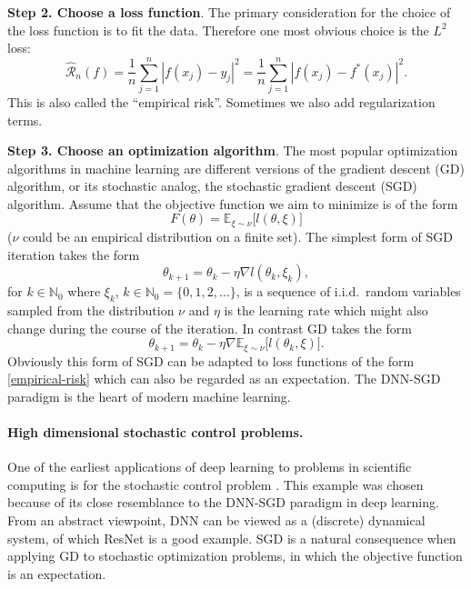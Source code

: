 \documentclass[12pt]{article}
\theoremstyle{definition}
\newcommand{\E}{\mathbb{E}}
\newcommand{\N}{\mathbb{N}}
\newcommand{\bx}{{x}}
\begin{document}
{\bf Step 2. Choose a loss function}. The primary consideration for the
choice of the loss function is to fit the data.  Therefore one most obvious
choice is the $L^2$ loss:
\begin{equation}
\hat{\mathcal{R}}_n(f) = \frac1n \sum_{j=1}^n | f(\bx_j) - y_j |^2 = \frac 1n \sum_{j=1}^n | f(\bx_j) - f^*(\bx_j) |^2.
\label{empirical-risk}
\end{equation}
This is also called the ``empirical risk''.
Sometimes we also add regularization terms.

{\bf Step 3. Choose an optimization algorithm}.  
The most popular optimization algorithms in machine learning are different versions of
the gradient descent (GD) algorithm, or its stochastic analog, the
stochastic gradient descent (SGD) algorithm. Assume that the objective function we aim to minimize is of the form
\begin{equation}
F(\theta) = \E_{\xi \sim \nu}\big[ l(\theta, \xi) \big]
\label{expectation}
\end{equation}
($\nu$ could be an empirical distribution on a finite set). 
The simplest form of SGD iteration takes the form 
%
\begin{equation}
\theta_{k+1} = \theta_k - \eta \nabla l(\theta_k, \xi_k),
\end{equation}
for $ k \in \N_0 $ where $ \xi_k $, $ k \in \N_0 = \{ 0, 1, 2, \dots \} $, is a sequence of 
i.i.d.\ random variables sampled from the distribution $ \nu $ 
and $ \eta $ is the learning rate which might also change during the course of the iteration.
In contrast GD takes the form
\begin{equation}
\theta_{k+1} = \theta_k - \eta \nabla \E_{\xi \sim \nu}\big[ l(\theta_k, \xi) \big].
\end{equation}
Obviously this form of SGD can be adapted to loss functions of the form \eqref{empirical-risk} which can also be
regarded as an expectation.
The DNN-SGD paradigm is the heart of modern machine learning.

\paragraph{High dimensional stochastic control problems.}

One of the earliest applications of deep learning to problems in scientific computing is 
for the stochastic control problem \cite{HanE2016deepcontrol}.
This example was chosen because of its close resemblance to the DNN-SGD paradigm in deep learning.
From an abstract viewpoint, DNN can be viewed as a (discrete) dynamical system, of which  ResNet is a good example.
SGD is a natural consequence when applying GD to stochastic optimization problems, in which the objective function is an expectation.
\end{document}

